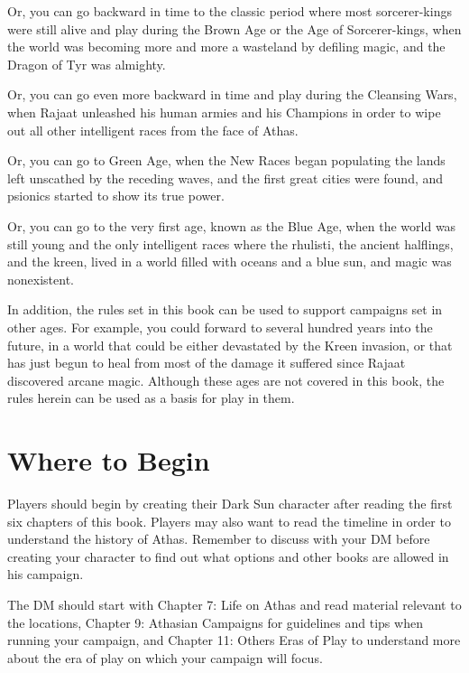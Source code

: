 Or, you can go backward in time to the classic period where most sorcerer-kings were still alive and play during the Brown Age or the Age of Sorcerer-kings, when the world was becoming more and more a wasteland by defiling magic, and the Dragon of Tyr was almighty.

Or, you can go even more backward in time and play during the Cleansing Wars, when Rajaat unleashed his human armies and his Champions in order to wipe out all other intelligent races from the face of Athas.

Or, you can go to Green Age, when the New Races began populating the lands left unscathed by the receding waves, and the first great cities were found, and psionics started to show its true power.

Or, you can go to the very first age, known as the Blue Age, when the world was still young and the only intelligent races where the rhulisti, the ancient halflings, and the kreen, lived in a world filled with oceans and a blue sun, and magic was nonexistent.

In addition, the rules set in this book can be used to support campaigns set in other ages. For example, you could forward to several hundred years into the future, in a world that could be either devastated by the Kreen invasion, or that has just begun to heal from most of the damage it suffered since Rajaat discovered arcane magic. Although these ages are not covered in this book, the rules herein can be used as a basis for play in them.

\section{Where to Begin}

Players should begin by creating their {\tableheader Dark Sun} character after reading the first six chapters of this book. Players may also want to read the timeline in order to understand the history of Athas. Remember to discuss with your DM before creating your character to find out what options and other books are allowed in his campaign.

The DM should start with Chapter 7: Life on Athas and read material relevant to the locations, Chapter 9: Athasian Campaigns for guidelines and tips when running your campaign, and Chapter 11: Others Eras of Play to understand more about the era of play on which your campaign will focus.
